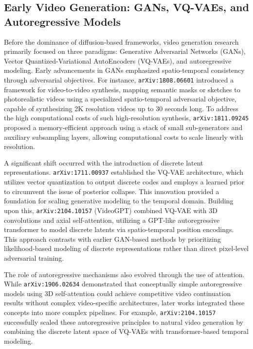 \documentclass[11pt]{article}
\begin{document}
\subsection{Early Video Generation: GANs, VQ-VAEs, and Autoregressive Models}

Before the dominance of diffusion-based frameworks, video generation research primarily focused on three paradigms: Generative Adversarial Networks (GANs), Vector Quantized-Variational AutoEncoders (VQ-VAEs), and autoregressive modeling. Early advancements in GANs emphasized spatio-temporal consistency through adversarial objectives. For instance, \texttt{arXiv:1808.06601} introduced a framework for video-to-video synthesis, mapping semantic masks or sketches to photorealistic videos using a specialized spatio-temporal adversarial objective, capable of synthesizing 2K resolution videos up to 30 seconds long. To address the high computational costs of such high-resolution synthesis, \texttt{arXiv:1811.09245} proposed a memory-efficient approach using a stack of small sub-generators and auxiliary subsampling layers, allowing computational costs to scale linearly with resolution.

A significant shift occurred with the introduction of discrete latent representations. \texttt{arXiv:1711.00937} established the VQ-VAE architecture, which utilizes vector quantization to output discrete codes and employs a learned prior to circumvent the issue of posterior collapse. This innovation provided a foundation for scaling generative modeling to the temporal domain. Building upon this, \texttt{arXiv:2104.10157} (VideoGPT) combined VQ-VAE with 3D convolutions and axial self-attention, utilizing a GPT-like autoregressive transformer to model discrete latents via spatio-temporal position encodings. This approach contrasts with earlier GAN-based methods by prioritizing likelihood-based modeling of discrete representations rather than direct pixel-level adversarial training.

The role of autoregressive mechanisms also evolved through the use of attention. While \texttt{arXiv:1906.02634} demonstrated that conceptually simple autoregressive models using 3D self-attention could achieve competitive video continuation results without complex video-specific architectures, later works integrated these concepts into more complex pipelines. For example, \texttt{arXiv:2104.10157} successfully scaled these autoregressive principles to natural video generation by combining the discrete latent space of VQ-VAEs with transformer-based temporal modeling.
\end{document}
